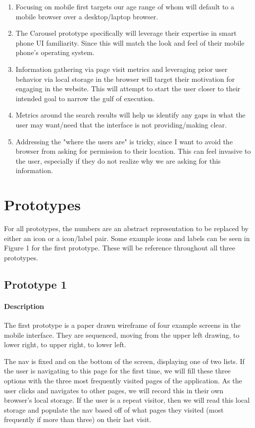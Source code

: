 \begin{enumerate}
\item
  Focusing on mobile first targets our age range of whom will default to a mobile browser over a desktop/laptop browser.
\item
  The Carousel prototype specifically will leverage their expertise in smart phone UI familiarity. Since this will match the look and feel of their mobile phone's operating system.
\item
  Information gathering via page visit metrics and leveraging prior user behavior via local storage in the browser will target their motivation for engaging in the website. This will attempt to start the user closer to their intended goal to narrow the gulf of execution.
\item
  Metrics around the search results will help us identify any gaps in what the user may want/need that the interface is not providing/making clear.
\item
  Addressing the "where the users are" is tricky, since I want to avoid the browser from asking for permission to their location. This can feel invasive to the user, especially if they do not realize why we are asking for this information.
\end{enumerate}

\section{Prototypes}

For all prototypes, the numbers are an abstract representation to be replaced by either an icon or a icon/label pair. Some example icons and labels can be seen in Figure 1 for the first prototype. These will be reference throughout all three prototypes.

\subsection{Prototype 1}
\paragraph{Description} The first prototype is a paper drawn wireframe of four example screens in the mobile interface. They are sequenced, moving from the upper left drawing, to lower right, to upper right, to lower left.

The nav is fixed and on the bottom of the screen, displaying one of two lists. If the user is navigating to this page for the first time, we will fill these three options with the three most frequently visited pages of the application. As the user clicks and navigates to other pages, we will record this in their own browser's local storage. If the user is a repeat visitor, then we will read this local storage and populate the nav based off of what pages they visited (most frequently if more than three) on their last visit.

